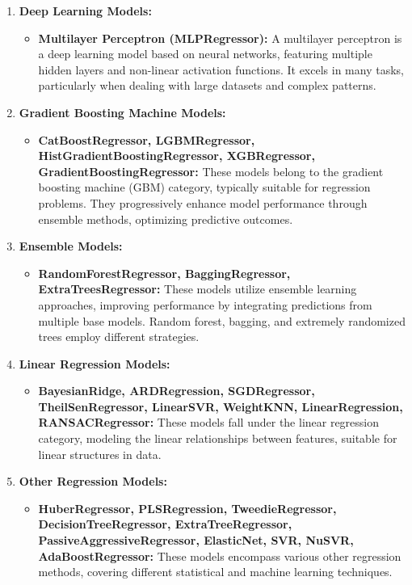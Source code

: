 \documentclass[twocolumn]{article}
\begin{document}
\begin{enumerate}[label= \textbf{\arabic*.}, left=0pt, itemsep=4pt]

\item \textbf{Deep Learning Models:}
    \begin{itemize}
        \item \textbf{Multilayer Perceptron (MLPRegressor):} A multilayer perceptron is a deep learning model based on neural networks, featuring multiple hidden layers and non-linear activation functions. It excels in many tasks, particularly when dealing with large datasets and complex patterns.
    \end{itemize}

\item \textbf{Gradient Boosting Machine Models:}
    \begin{itemize}
        \item \textbf{CatBoostRegressor, LGBMRegressor, HistGradientBoostingRegressor, XGBRegressor, GradientBoostingRegressor:} These models belong to the gradient boosting machine (GBM) category, typically suitable for regression problems. They progressively enhance model performance through ensemble methods, optimizing predictive outcomes.
    \end{itemize}

\item \textbf{Ensemble Models:}
    \begin{itemize}
        \item \textbf{RandomForestRegressor, BaggingRegressor, ExtraTreesRegressor:} These models utilize ensemble learning approaches, improving performance by integrating predictions from multiple base models. Random forest, bagging, and extremely randomized trees employ different strategies.
    \end{itemize}

\item \textbf{Linear Regression Models:}
    \begin{itemize}
        \item \textbf{BayesianRidge, ARDRegression, SGDRegressor, TheilSenRegressor, LinearSVR, WeightKNN, LinearRegression, RANSACRegressor:} These models fall under the linear regression category, modeling the linear relationships between features, suitable for linear structures in data.
    \end{itemize}

\item \textbf{Other Regression Models:}
    \begin{itemize}
        \item \textbf{HuberRegressor, PLSRegression, TweedieRegressor, DecisionTreeRegressor, ExtraTreeRegressor, PassiveAggressiveRegressor, ElasticNet, SVR, NuSVR, AdaBoostRegressor:} These models encompass various other regression methods, covering different statistical and machine learning techniques.
    \end{itemize}

\end{enumerate}
\end{document}
